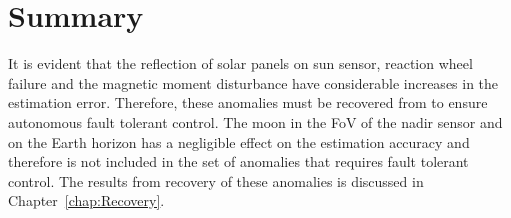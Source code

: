 \section{Summary}
It is evident that the reflection of solar panels on sun sensor, reaction wheel failure and the magnetic moment disturbance have considerable increases in the estimation error. Therefore, these anomalies must be recovered from to ensure autonomous fault tolerant control. The moon in the FoV of the nadir sensor and on the Earth horizon has a negligible effect on the estimation accuracy and therefore is not included in the set of anomalies that requires fault tolerant control. The results from recovery of these anomalies is discussed in Chapter~\ref{chap:Recovery}.

%	
%	
%
%	
%	
%
%	
%	
%
%
%	
%	
%
%	
%	
%
%	
%	
